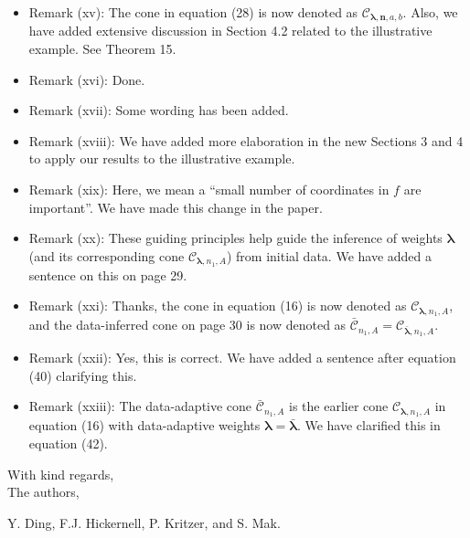 \documentclass[11pt]{article}
\newcommand{\calC}{\mathcal{C}}
\begin{document}
\begin{itemize}
\item Remark (xv): The cone in equation (28) is now denoted as $\calC_{\boldsymbol{\lambda},\boldsymbol{n},a,b}$.  Also, we have added extensive discussion in Section 4.2 related to the illustrative example.  See Theorem 15.
\item Remark (xvi): Done.
\item Remark (xvii): Some wording has been added.
\item Remark (xviii): We have added more elaboration in the new Sections 3 and 4 to apply our results to the illustrative example.
\item Remark (xix): Here, we mean a ``small number of coordinates in $f$ are important''. We have made this change in the paper.
\item Remark (xx): These guiding principles help guide the inference of weights $\boldsymbol{\lambda}$ (and its corresponding cone $\calC_{\boldsymbol{\lambda},n_1,A}$) from initial data. We have added a sentence on this on page 29. 
\item Remark (xxi): Thanks, the cone in equation (16) is now denoted as $\calC_{\boldsymbol{\lambda},n_1,A}$, and the data-inferred cone on page 30 is now denoted as $\bar{\calC}_{n_1,A} = \calC_{\bar{\boldsymbol{\lambda}},n_1,A}$.
\item Remark (xxii): Yes, this is correct. We have added a sentence after equation (40) clarifying this.
\item Remark (xxiii): The data-adaptive cone $\bar{\calC}_{n_1,A}$ is the earlier cone $\calC_{\boldsymbol{\lambda},n_1,A}$ in equation (16) with data-adaptive weights $\boldsymbol{\lambda} = \bar{\boldsymbol{\lambda}}$. We have clarified this in equation (42).

\end{itemize}

\bigskip 

\bigskip

\noindent With kind regards,\\[0.25cm]
The authors, 

\noindent Y. Ding, F.J. Hickernell, P. Kritzer, and S. Mak.
\end{document}
